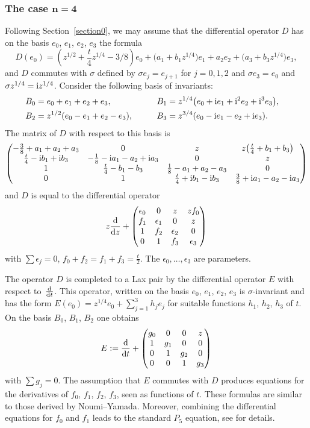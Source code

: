 \documentclass[10pt,a4paper]{amsart}
\numberwithin{equation}{section}
\begin{document}
\subsubsection[The case n=4]{The case $\boldsymbol{n=4}$}\label{section2.2.1}
Following Section~\ref{section0}, we may assume that the differential operator $D$ has on the basis $e_0$, $e_1$, $e_2$, $e_3$ the
 formula
 \[D(e_0)=\left(z^{1/2}+\frac{t}{4} z^{1/4}-3/8\right) e_0 +\bigl(a_1+b_1z^{1/4}\bigr) e_1+a_2 e_2+\bigl(a_3+b_3z^{1/4}\bigr) e_3, \]
 and $D$ commutes with $\sigma$ defined by $\sigma e_j=e_{j+1}$ for $j=0,1,2$ and $\sigma e_3=e_0$ and
 $\sigma z^{1/4}={\rm i}z^{1/4}$.
 Consider the following basis of invariants:
 \begin{alignat*}{3}
& B_0=e_0+e_1+e_2+e_3,\qquad && B_1=z^{1/4}\bigl(e_0+{\rm i}e_1+{\rm i}^2e_2+{\rm i}^3e_3\bigr),& \\
& B_2=z^{1/2}(e_0-e_1+e_2-e_3),\qquad && B_3=z^{3/4}(e_0-{\rm i}e_1-e_2+{\rm i}e_3).&
\end{alignat*}
 The matrix of $D$ with respect to this basis is
\[ \begin{pmatrix} -\frac{3}{8}+a_1+a_2+a_3 & 0 & z & z\bigl(\frac{t}{4}+b_1+b_3\bigr) \\
 \frac{t}{4}-{\rm i}b_1+{\rm i}b_3 & -\frac{1}{8}-{\rm i}a_1-a_2+{\rm i}a_3 & 0 &z \\
 1 &\frac{t}{4}-b_1-b_3 &\frac{1}{8}-a_1+a_2-a_3 & 0 \\
 0 & 1 & \frac{t}{4}+{\rm i}b_1-{\rm i}b_3 &\frac{3}{8}+{\rm i}a_1-a_2-{\rm i}a_3
 \end{pmatrix} \]
 and $D$ is equal to the differential operator
 \[
 z\frac{{\rm d}}{{\rm d}z}+\begin{pmatrix} \epsilon_0&0&z&zf_0\\
 f_1&\epsilon_1&0&z\\ 1&f_2&\epsilon_2& 0\\ 0&1&f_3&\epsilon_3 \end{pmatrix}
 \]
 with $\sum \epsilon _j=0$, $f_0+f_2=f_1+f_3=\frac{t}{2}$. The $\epsilon_0,\dots ,\epsilon_3$ are parameters.

 The operator $D$ is completed to a Lax pair by the differential operator $E$ with respect to~$\frac{{\rm d}}{{\rm d}t}$. This
 operator, written on the basis $e_0$, $e_1$, $e_2$, $e_3$ is $\sigma$-invariant and has the form
 $E(e_0)=z^{1/4}e_0+\sum _{j=1}^3h_je_j$ for suitable functions $h_1$, $h_2$, $h_3$ of $t$. On the basis
 $B_0 $, $B_1$, $B_2$ one obtains
 \[
 E:=\frac{{\rm d}}{{\rm d}t}+ \begin{pmatrix}g_0& 0& 0&z\\ 1&g_1&0&0\\0&1&g_2&0\\0&0&1&g_3 \end{pmatrix}
 \]
 with $\sum g_j=0$. The assumption that $E$ commutes with $D$ produces equations for
 the derivatives of $f_0$, $f_1$, $f_2$, $f_3$, seen as functions of $t$. These formulas are similar to those derived by
 Noumi--Yamada. Moreover, combining the differential equations for $f_0$ and $f_1$ leads to the standard $P_5$ equation,
 see \cite{N-Y,S-H-C} for details.
\end{document}
